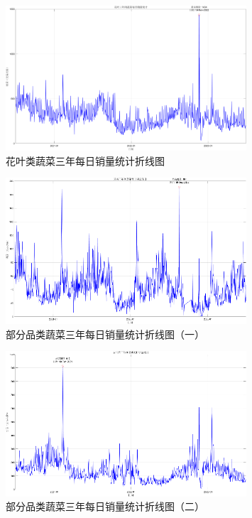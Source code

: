 \documentclass{MathNoteCN}
\begin{document}
\begin{figure}[H]
    \centering
    \includegraphics[width=0.8\textwidth]{花叶三年间蔬菜每日销量统计.png} 
    \caption{花叶类蔬菜三年每日销量统计折线图}
\end{figure}

\begin{figure}[H]
    \centering
    \includegraphics[width=0.8\textwidth]{其他品类日销量折线图1.png} 
    \caption{部分品类蔬菜三年每日销量统计折线图（一）}
\end{figure}

\begin{figure}[H]
    \centering
    \includegraphics[width=0.8\textwidth]{其他品类日销量折线图2.png} 
    \caption{部分品类蔬菜三年每日销量统计折线图（二）}
\end{figure}
\end{document}
